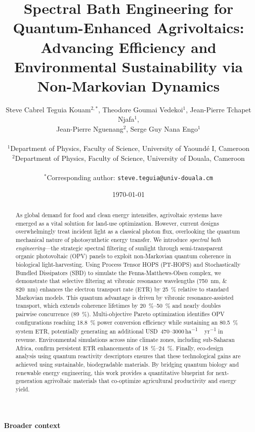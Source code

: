 \documentclass[11pt,a4paper]{article}
\title{\textbf{Spectral Bath Engineering for Quantum-Enhanced Agrivoltaics: Advancing Efficiency and Environmental Sustainability via Non-Markovian Dynamics}}
\author{
    Steve Cabrel Teguia Kouam$^{2,*}$,
    Theodore Goumai Vedekoi$^{1}$, 
    Jean-Pierre Tchapet Njafa$^{1}$, \\
    Jean-Pierre Nguenang$^{2}$,
    Serge Guy Nana Engo$^{1}$ \\
    \\
    $^{1}$Department of Physics, Faculty of Science, University of Yaoundé I, Cameroon \\
    $^{2}$Department of Physics, Faculty of Science, University of Douala, Cameroon \\
    \\
    $^{*}$Corresponding author: \texttt{steve.teguia@univ-douala.cm}
}
\date{\today}
\begin{document}
\maketitle


\begin{abstract}
As global demand for food and clean energy intensifies, agrivoltaic systems have emerged as a vital solution for land-use optimization. However, current designs overwhelmingly treat incident light as a classical photon flux, overlooking the quantum mechanical nature of photosynthetic energy transfer. We introduce \textit{spectral bath engineering}---the strategic spectral filtering of sunlight through semi-transparent organic photovoltaic (OPV) panels to exploit non-Markovian quantum coherence in biological light-harvesting. Using Process Tensor HOPS (PT-HOPS) and Stochastically Bundled Dissipators (SBD) to simulate the Fenna-Matthews-Olsen complex, we demonstrate that selective filtering at vibronic resonance wavelengths (\SIlist{750;820}{\nano\meter}) enhances the electron transport rate (ETR) by \SI{25}{\percent} relative to standard Markovian models. This quantum advantage is driven by vibronic resonance-assisted transport, which extends coherence lifetimes by \SIrange{20}{50}{\percent} and nearly doubles pairwise concurrence (\SI{+89}{\percent}). Multi-objective Pareto optimization identifies OPV configurations reaching \SI{18.8}{\percent} power conversion efficiency while sustaining an \SI{80.5}{\percent} system ETR, potentially generating an additional USD~\numrange{470}{3000}\,\si{ha^{-1}\,yr^{-1}} in revenue. Environmental simulations across nine climate zones, including sub-Saharan Africa, confirm persistent ETR enhancements of \SIrange{18}{24}{\percent}. Finally, eco-design analysis using quantum reactivity descriptors ensures that these technological gains are achieved using sustainable, biodegradable materials. By bridging quantum biology and renewable energy engineering, this work provides a quantitative blueprint for next-generation agrivoltaic materials that co-optimize agricultural productivity and energy yield.
\end{abstract}

\noindent\textbf{Broader context}
\end{document}
